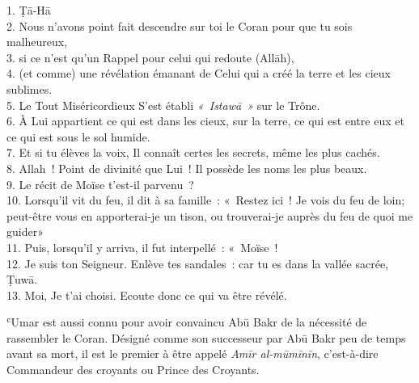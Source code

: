 {


1. Ṭā-Hā\\
{2.}
Nous n'avons point fait descendre sur toi le Coran pour que tu sois
malheureux,\\
{3.}
si ce n'est qu'un Rappel pour celui qui redoute (Allāh),\\
{4.}
(et comme) une révélation émanant de Celui qui a créé la terre et les
cieux sublimes.\\
{5.}
Le Tout Miséricordieux S'est établi \emph{«~Istawā~»} sur le Trône.\\
{6.}
À Lui appartient ce qui est dans les cieux, sur la terre, ce qui est
entre eux et ce qui est sous le sol humide.\\
{7.}
Et si tu élèves la voix, Il connaît certes les secrets, même les plus
cachés.\\
{8.}
Allah~! Point de divinité que Lui~! Il possède les noms les plus
beaux.\\
{9.}
Le récit de Moïse t'est-il parvenu~?\\
{10.}
Lorsqu'il vit du feu, il dit à sa famille~: «~Restez ici~! Je vois du
feu de loin; peut-être vous en apporterai-je un tison, ou trouverai-je
auprès du feu de quoi me
guider»\\
{11.}
Puis, lorsqu'il y arriva, il fut interpellé~: «~Moïse~!\\
{12.}
Je suis ton Seigneur. Enlève tes sandales~: car tu es dans la vallée
sacrée, Ṭuwā.\\
{13.}
Moi, Je t'ai choisi. Ecoute donc ce qui va être révélé.

ʿUmar est aussi connu pour avoir convaincu Abū Bakr de la nécessité de
rassembler le Coran. Désigné comme son successeur par Abū Bakr peu de
temps avant sa mort, il est le premier à être appelé \emph{Amīr
al-mūmīnīn}, c'est-à-dire Commandeur des croyants ou Prince des
Croyants.


}
